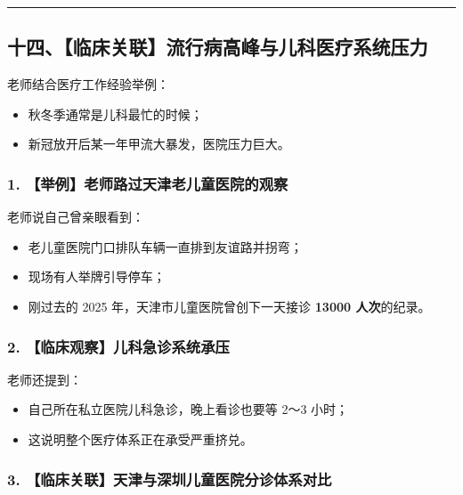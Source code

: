 \documentclass[
  chinese,
  9pt,
  a4paper,
]{ctexart}
\providecommand{\tightlist}{%
  \setlength{\itemsep}{0pt}\setlength{\parskip}{0pt}}
\begin{document}
\begin{center}\rule{0.5\linewidth}{0.5pt}\end{center}

\subsection{十四、【临床关联】流行病高峰与儿科医疗系统压力}\label{ux5341ux56dbux4e34ux5e8aux5173ux8054ux6d41ux884cux75c5ux9ad8ux5cf0ux4e0eux513fux79d1ux533bux7597ux7cfbux7edfux538bux529b}

老师结合医疗工作经验举例：

\begin{itemize}
\tightlist
\item
  秋冬季通常是儿科最忙的时候；
\item
  新冠放开后某一年甲流大暴发，医院压力巨大。
\end{itemize}

\subsubsection{1.
【举例】老师路过天津老儿童医院的观察}\label{ux4e3eux4f8bux8001ux5e08ux8defux8fc7ux5929ux6d25ux8001ux513fux7ae5ux533bux9662ux7684ux89c2ux5bdf}

老师说自己曾亲眼看到：

\begin{itemize}
\tightlist
\item
  老儿童医院门口排队车辆一直排到友谊路并拐弯；
\item
  现场有人举牌引导停车；
\item
  刚过去的 2025 年，天津市儿童医院曾创下一天接诊 \textbf{13000
  人次}的纪录。
\end{itemize}

\subsubsection{2.
【临床观察】儿科急诊系统承压}\label{ux4e34ux5e8aux89c2ux5bdfux513fux79d1ux6025ux8bcaux7cfbux7edfux627fux538b}

老师还提到：

\begin{itemize}
\tightlist
\item
  自己所在私立医院儿科急诊，晚上看诊也要等 2～3 小时；
\item
  这说明整个医疗体系正在承受严重挤兑。
\end{itemize}

\subsubsection{3.
【临床关联】天津与深圳儿童医院分诊体系对比}\label{ux4e34ux5e8aux5173ux8054ux5929ux6d25ux4e0eux6df1ux5733ux513fux7ae5ux533bux9662ux5206ux8bcaux4f53ux7cfbux5bf9ux6bd4}
\end{document}
